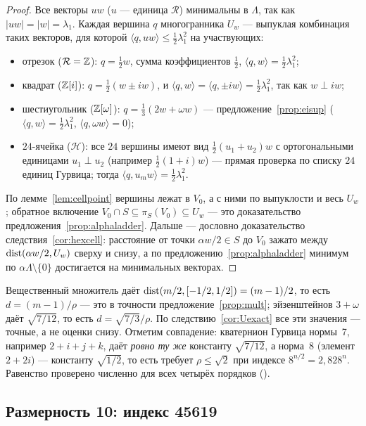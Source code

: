 \begin{proof}
Все векторы $uw$ ($u$ --- единица $\mathcal R$) минимальны в $\Lambda$, так как
$|uw|=|w|=\lambda_1$. Каждая вершина $q$ многогранника $U_w$ --- выпуклая
комбинация таких векторов, для которой $\langle q,uw\rangle\le\frac12\lambda_1^2$
на участвующих:
\begin{itemize}[leftmargin=1.4em,itemsep=1pt]
\item отрезок ($\mathcal R=\mathbb{Z}$): $q=\frac12w$, сумма коэффициентов $\frac12$,
$\langle q,w\rangle=\frac12\lambda_1^2$;
\item квадрат ($\mathbb{Z}[i]$): $q=\frac12(w\pm iw)$, и $\langle q,w\rangle=
\langle q,\pm iw\rangle=\frac12\lambda_1^2$, так как $w\perp iw$;
\item шестиугольник ($\mathbb{Z}[\omega]$): $q=\frac13(2w+\omega w)$ ---
предложение~\ref{prop:eisup} ($\langle q,w\rangle=\frac12\lambda_1^2$,
$\langle q,\omega w\rangle=0$);
\item $24$-ячейка ($\mathcal H$): все $24$ вершины имеют вид
$\frac12(u_1+u_2)w$ с ортогональными единицами $u_1\perp u_2$ (например
$\frac12(1+i)w$) --- прямая проверка по списку $24$ единиц Гурвица; тогда
$\langle q,u_mw\rangle=\frac12\lambda_1^2$.
\end{itemize}
По лемме~\ref{lem:cellpoint} вершины лежат в $V_0$, а с ними по выпуклости и
весь $U_w$; обратное включение $V_0\cap S\subseteq\pi_S(V_0)\subseteq U_w$ ---
это доказательство предложения~\ref{prop:alphaladder}. Дальше --- дословно
доказательство следствия~\ref{cor:hexcell}: расстояние от точки $\alpha w/2\in S$
до $V_0$ зажато между $\operatorname{dist}(\alpha w/2,U_w)$ сверху и снизу, а по
предложению~\ref{prop:alphaladder} минимум по $\alpha\Lambda\setminus\{0\}$
достигается на минимальных векторах.
\end{proof}

Вещественный множитель даёт $\operatorname{dist}(m/2,[-1/2,1/2])=(m-1)/2$, то есть
$d=(m-1)/\rho$ --- это в точности предложение~\ref{prop:mult}; эйзенштейнов
$3+\omega$ даёт $\sqrt{7/12}$, то есть $d=\sqrt{7/3}/\rho$. По
следствию~\ref{cor:Uexact} все эти значения --- точные, а не оценки снизу.
Отметим совпадение: кватернион Гурвица нормы~7, например $2+i+j+k$, даёт
\emph{ровно ту же} константу $\sqrt{7/12}$, а норма~8 (элемент $2+2i$) ---
константу $\sqrt{1/2}$, то есть требует $\rho\le\sqrt2$ при индексе
$8^{n/2}=2{,}828^n$. Равенство проверено численно для всех четырёх порядков
().

\subsection{Размерность 10: индекс 45619}
\label{ssec:dim10}

